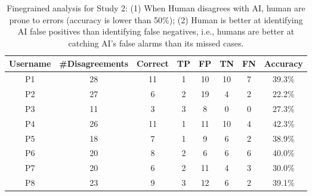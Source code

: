 \begin{table}[]
\caption{Finegrained analysis for Study 2: (1) When Human disagrees with AI, human are prone to errors (accuracy is lower than 50\%); (2) Human is better at identifying AI false positives than identifying false negatives, i.e., humans are better at catching AI’s false alarms than its missed cases.}
\begin{tabular}{@{}cccccccc@{}}
\toprule
\textbf{Username} & \textbf{\#Disagreements} &  \textbf{Correct} & \textbf{TP} & \textbf{FP} & \textbf{TN} & \textbf{FN} & \textbf{Accuracy} \\
\midrule
P1   & 28                    & 11      & 1  & 10 & 10 & 7  & 39.3\% \\
P2  & 27                    & 6       & 2  & 19 & 4  & 2  & 22.2\% \\
P3         & 11                    & 3       & 3  & 8  & 0  & 0  & 27.3\% \\
P4   & 26                    & 11      & 1  & 11 & 10 & 4  & 42.3\% \\
P5    & 18                    & 7       & 1  & 9  & 6  & 2  & 38.9\% \\
P6    & 20                    & 8       & 2  & 6  & 6  & 6  & 40.0\%      \\
P7      & 20                    & 6       & 2  & 11 & 4  & 3  & 30.0\%      \\
P8 & 23                    & 9       & 3  & 12 & 6  & 2  & 39.1\% \\ \bottomrule
\end{tabular}
\label{tab:study2-fine}
\end{table}